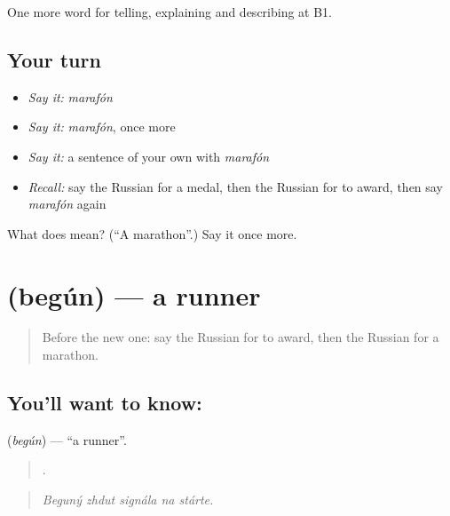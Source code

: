 \begin{grammarlens}[title={What you've built}]
One more word for telling, explaining and describing at B1.
\end{grammarlens}

\subsection*{Your turn}
\begin{itemize}
\raggedright
  \item \emph{Say it:} \emph{marafón}
  \item \emph{Say it:} \emph{marafón}, once more
  \item \emph{Say it:} a sentence of your own with \emph{marafón}
  \item \emph{Recall:} say the Russian for a medal, then the Russian for to award, then say \emph{marafón} again
\end{itemize}

\begin{tcolorbox}[breakable,colback=teal!4,colframe=teal!35!black,title={Before you move on}]
What does  mean? (\textquotedblleft{}A marathon\textquotedblright{}.) Say it once more.
\end{tcolorbox}
\section[\texorpdfstring{\ru{бегун} (begún)}{бегун (begún)}]{ (begún) — a runner}

\label{lesson:RU-C512-begun}



\begin{quote}
Before the new one: say the Russian for to award, then the Russian for a marathon.
\end{quote}

\subsection*{You'll want to know: }
\textbf{} (\emph{begún}) — \textquotedblleft{}a runner\textquotedblright{}.

\begin{quote}
    .
\end{quote}

\begin{quote}
\emph{Beguný zhdut signála na stárte.}
\end{quote}

